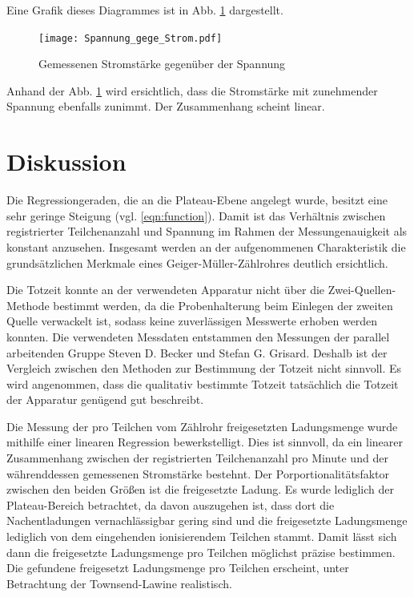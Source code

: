 Eine Grafik dieses Diagrammes ist in Abb. \ref{fig:Spannung gegen Strom}
dargestellt.

\begin{figure}
  \centering
  \texttt{[image: Spannung\_gege\_Strom.pdf]}
  \caption{Gemessenen Stromstärke gegenüber der Spannung}
  \label{fig:Spannung gegen Strom}
\end{figure}

Anhand der Abb. \ref{fig:Spannung gegen Strom} wird ersichtlich, dass die Stromstärke
mit zunehmender Spannung ebenfalls zunimmt. Der Zusammenhang scheint linear.

\section{Diskussion}

Die Regressiongeraden, die an die Plateau-Ebene angelegt wurde,
besitzt eine sehr geringe Steigung (vgl. \ref{eqn:function}).
Damit ist das Verhältnis zwischen registrierter Teilchenanzahl und Spannung
im Rahmen der Messungenauigkeit als konstant anzusehen. Insgesamt werden
an der aufgenommenen Charakteristik die grundsätzlichen Merkmale eines
Geiger-Müller-Zählrohres deutlich ersichtlich.

Die Totzeit konnte an der verwendeten Apparatur nicht über die Zwei-Quellen-Methode
bestimmt werden, da die Probenhalterung beim Einlegen der zweiten Quelle
verwackelt ist, sodass keine zuverlässigen Messwerte erhoben werden konnten.
Die verwendeten Messdaten entstammen den Messungen der parallel arbeitenden
Gruppe Steven D. Becker und Stefan G. Grisard.
Deshalb ist der Vergleich zwischen den Methoden zur Bestimmung der Totzeit
nicht sinnvoll. Es wird angenommen, dass die qualitativ bestimmte
Totzeit tatsächlich die Totzeit der Apparatur genügend gut beschreibt.

Die Messung der pro Teilchen vom Zählrohr freigesetzten Ladungsmenge wurde mithilfe
einer linearen Regression bewerkstelligt. Dies ist sinnvoll, da ein linearer
Zusammenhang zwischen der registrierten Teilchenanzahl pro Minute und der
währenddessen gemessenen Stromstärke bestehnt.
Der Porportionalitätsfaktor zwischen den beiden Größen ist die freigesetzte
Ladung. Es wurde lediglich der Plateau-Bereich betrachtet, da davon auszugehen
ist, dass dort die Nachentladungen vernachlässigbar gering sind und die
freigesetzte Ladungsmenge lediglich von dem eingehenden ionisierendem
Teilchen stammt. Damit lässt sich dann die freigesetzte Ladungsmenge pro Teilchen
möglichst präzise bestimmen. Die gefundene freigesetzt Ladungsmenge pro Teilchen
erscheint, unter Betrachtung der Townsend-Lawine realistisch.


